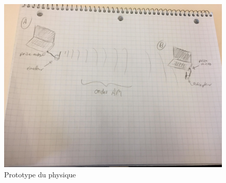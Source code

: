 \begin{figure}[ht!]
    \centering
    \caption{Prototype du physique}
    \includegraphics[width=0.4\linewidth]{images/proto/visualisation_transmission.jpg}
\end{figure}